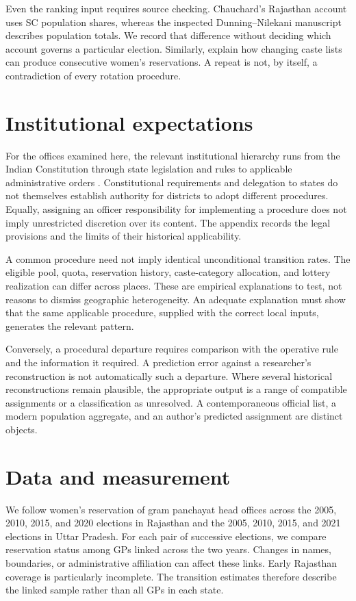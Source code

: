 \documentclass[11pt]{article}
\begin{document}
Even the ranking input requires source checking. Chauchard's Rajasthan account uses SC population shares, whereas the inspected Dunning--Nilekani manuscript describes population totals. We record that difference without deciding which account governs a particular election. Similarly, \citet{beaman2009} explain how changing caste lists can produce consecutive women's reservations. A repeat is not, by itself, a contradiction of every rotation procedure.

\begin{landscape}
\begingroup\footnotesize

\endgroup
\end{landscape}

\section{Institutional expectations}
For the offices examined here, the relevant institutional hierarchy runs from the Indian Constitution through state legislation and rules to applicable administrative orders \citep{constitution,rajasthanact,rajasthanrules,upact,uprules,up2021}. Constitutional requirements and delegation to states do not themselves establish authority for districts to adopt different procedures. Equally, assigning an officer responsibility for implementing a procedure does not imply unrestricted discretion over its content. The appendix records the legal provisions and the limits of their historical applicability.

A common procedure need not imply identical unconditional transition rates. The eligible pool, quota, reservation history, caste-category allocation, and lottery realization can differ across places. These are empirical explanations to test, not reasons to dismiss geographic heterogeneity. An adequate explanation must show that the same applicable procedure, supplied with the correct local inputs, generates the relevant pattern.

Conversely, a procedural departure requires comparison with the operative rule and the information it required. A prediction error against a researcher's reconstruction is not automatically such a departure. Where several historical reconstructions remain plausible, the appropriate output is a range of compatible assignments or a classification as unresolved. A contemporaneous official list, a modern population aggregate, and an author's predicted assignment are distinct objects.

\section{Data and measurement}
We follow women's reservation of gram panchayat head offices across the 2005, 2010, 2015, and 2020 elections in Rajasthan and the 2005, 2010, 2015, and 2021 elections in Uttar Pradesh. For each pair of successive elections, we compare reservation status among GPs linked across the two years. Changes in names, boundaries, or administrative affiliation can affect these links. Early Rajasthan coverage is particularly incomplete. The transition estimates therefore describe the linked sample rather than all GPs in each state.
\end{document}

